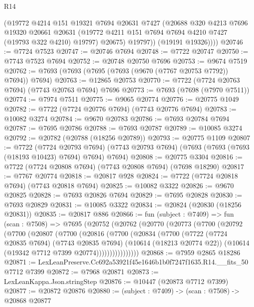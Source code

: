 \begin{lexlean}{R14}
\begin{coremodule}
            (@19772
              @4214
              @151
              @19321
              @7694
              @20631
              @7427
              (@20688
                @320
                @4213
                @7696
                @19320
                @20661
                @20631
                (@19772 @4211 @151 @7694 @7694 @4210 @7427 (@19793 @322 @4210) @19797)
                @20675)
              @19797))
          (@19191 @19326))))
@20746 := @7724 @7523
@20747 := @20746 @7694
@20748 := @7722 @20747
@20750 := @7743 @7523 @7694
@20752 := @20748 @20750 @7696
@20753 := @9674 @7519
@20762 := @7693 (@7693 (@7695 (@7693 (@9670 (@7767 @20753 @7792)) @7694)) @7694)
@20763 := @12865 @20753
@20770 := @7722 (@7724 @20763 @7694) (@7743 @20763 @7694) @7696
@20773 := @7693 (@7698 (@7970 @7511))
@20774 := @7974 @7511
@20775 := @9065 @20774
@20776 := @20775 @1049
@20782 := @7722 (@7724 @20776 @7694) (@7743 @20776 @7694)
@20783 := @10082 @3274
@20784 := @9670 @20783
@20786 := @7693 @20784 @7694
@20787 := @7695 @20786
@20788 := @7693 @20787
@20789 := @10085 @3274
@20792 := @20782 (@20788 (@18256 @20789))
@20793 := @20775 @1109
@20807 := @7722
    (@7724 @20793 @7694)
    (@7743 @20793 @7694)
    (@7693 (@7693 (@7693 (@18193 @10423) @7694) @7694) @7694)
@20808 := @20775 @3304
@20816 := @7722 (@7724 @20808 @7694) (@7743 @20808 @7694) (@7698 @18290)
@20817 := @7767 @20774
@20818 := @20817 @928
@20824 := @7722 (@7724 @20818 @7694) (@7743 @20818 @7694)
@20825 := @10082 @3322
@20826 := @9670 @20825
@20828 := @7693 @20826 @7694
@20829 := @7695 @20828
@20830 := @7693 @20829
@20831 := @10085 @3322
@20834 := @20824 (@20830 (@18256 @20831))
@20835 := @20817 @886
@20866 := fun (subject : @7409) =>
  fun (scan : @7508) =>
  @7695
    (@20752
      (@20762
        (@20770
          (@20773
            (@7700
              (@20792
                (@7700
                  (@20807
                    (@7700
                      (@20816
                        (@7700
                          (@20834
                            (@7700
                              (@7722
                                (@7724 @20835 @7694)
                                (@7743 @20835 @7694)
                                (@10614 (@18213 @20774 @22))
                                (@10614 (@19342 @7712 @7399 @20774))))))))))))))))
@20868 := @7959 @2865 @18286
@20871 := LexLeanPreserve.Cc692a53921f45e1646b1b0f7247f1635.R14.__fits_50 @7712 @7399
@20872 := @7968 @20871
@20873 := LexLeanKappa.Json.stringStep
@20876 := @10447 (@20873 @7712 @7399)
@20877 := @20872 @20876
@20880 := (subject : @7409) -> (scan : @7508) -> @20868 @20877

\end{coremodule}
\end{lexlean}
